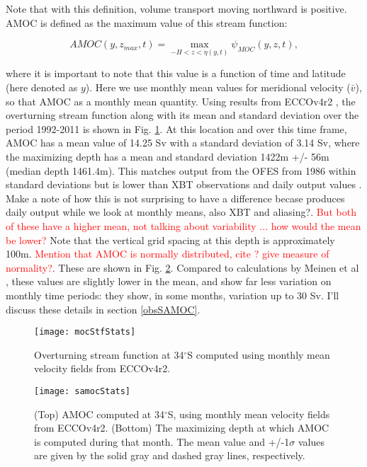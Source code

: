 \documentclass[a4paper,11pt]{article}
\newcommand{\red}[1]{\textcolor{red}{#1}}
\newcommand{\degSym}{$^{\circ}$}
\begin{document}
   Note that with this definition, volume transport moving northward is positive. AMOC is defined as the maximum value of this stream function: 
   
   \begin{equation}
    AMOC(y,z_{max},t) = \max_{-H < z < \eta(y,t)}{\psi_{MOC}(y,z,t)} ,
    \label{eq:amoc}
   \end{equation}

   where it is important to note that this value is a function of time and latitude (here denoted as $y$). Here we use monthly mean values for meridional velocity ($\bar{v}$), so that AMOC as a monthly mean quantity. Using results from ECCOv4r2 \cite{forgetEccov4}, the overturning stream function along with its mean and standard deviation over the period 1992-2011 is shown in Fig. \ref{fig:mocStfStats}. At this location and over this time frame, AMOC has a mean value of 14.25 Sv with a standard deviation of 3.14 Sv, where the maximizing depth has a mean and standard deviation 1422m +/- 56m (median depth 1461.4m). This matches output from the OFES from 1986 within standard deviations \cite{dongOFES} but is lower than XBT observations \cite{dong2009} and daily output values \cite{meinenSamoc}. Make a note of how this is not surprising to have a difference becase \cite{meinenSamoc} produces daily output while we look at monthly means, also XBT and aliasing?. \red{But both of these have a higher mean, not talking about variability ... how would the mean be lower?} Note that the vertical grid spacing at this depth is approximately 100m. \red{Mention that AMOC is normally distributed, cite \cite{wunschAmoc}? give measure of normality?}. These are shown in Fig. \ref{fig:samocStats}. Compared to calculations by Meinen et al \cite{meinenSamoc}, these values are slightly lower in the mean, and show far less variation on monthly time periods: they show, in some months, variation up to 30 Sv. I'll discuss these details in section \ref{obsSAMOC}. 

   
   \begin{figure}
    \centering
    \texttt{[image: mocStfStats]}
    \caption{Overturning stream function at 34\degSym S computed using monthly mean velocity fields from ECCOv4r2.}
    \label{fig:mocStfStats}
   \end{figure}
   
   \begin{figure}
    \centering
    \texttt{[image: samocStats]}
    \caption{(Top) AMOC computed at 34\degSym S, using monthly mean velocity fields from ECCOv4r2. (Bottom) The maximizing depth at which AMOC is computed during that month. The mean value and +/-1$\sigma$ values are given by the solid gray and dashed gray lines, respectively.}
    \label{fig:samocStats}
   \end{figure}
\end{document}
